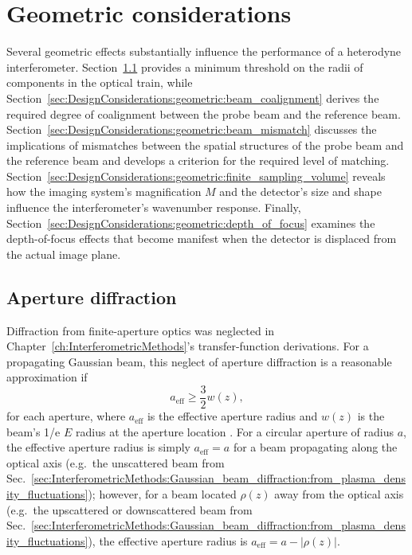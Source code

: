 \section{Geometric considerations}
\label{sec:DesignConsiderations:geometric}
Several geometric effects substantially influence
the performance of a heterodyne interferometer.
Section~\ref{sec:DesignConsiderations:geometric:aperture_diffraction}
provides a minimum threshold on the radii of components in the optical train,
while Section~\ref{sec:DesignConsiderations:geometric:beam_coalignment}
derives the required degree of coalignment between
the probe beam and the reference beam.
Section~\ref{sec:DesignConsiderations:geometric:beam_mismatch}
discusses the implications of mismatches between
the spatial structures of the probe beam and the reference beam and
develops a criterion for the required level of matching.
Section~\ref{sec:DesignConsiderations:geometric:finite_sampling_volume}
reveals how the imaging system's magnification $M$ and
the detector's size and shape
influence the interferometer's wavenumber response.
Finally, Section~\ref{sec:DesignConsiderations:geometric:depth_of_focus}
examines the depth-of-focus effects that become manifest
when the detector is displaced from the actual image plane.


\subsection{Aperture diffraction}
\label{sec:DesignConsiderations:geometric:aperture_diffraction}
Diffraction from finite-aperture optics was neglected in
Chapter~\ref{ch:InterferometricMethods}'s
transfer-function derivations.
For a propagating Gaussian beam,
this neglect of aperture diffraction is a reasonable approximation if
\begin{equation}
  a_{\text{eff}} \geq \frac{3}{2} w(z),
  \label{eq:DesignConsiderations:aperture_radius_for_minimal_diffraction}
\end{equation}
for each aperture, where
$a_{\text{eff}}$ is the effective aperture radius and
$w(z)$ is the beam's 1/e $E$ radius at the aperture location
\cite{campbell_josa69, rost_diffraction_pc14}.
For a circular aperture of radius $a$,
the effective aperture radius is simply $a_{\text{eff}} = a$
for a beam propagating along the optical axis
(e.g.\ the unscattered beam from
Sec.~\ref{sec:InterferometricMethods:Gaussian_beam_diffraction:from_plasma_density_fluctuations});
however, for a beam located $\rho(z)$ away from the optical axis
(e.g.\ the upscattered or downscattered beam from
Sec.~\ref{sec:InterferometricMethods:Gaussian_beam_diffraction:from_plasma_density_fluctuations}),
the effective aperture radius is $a_{\text{eff}} = a - |\rho(z)|$.


